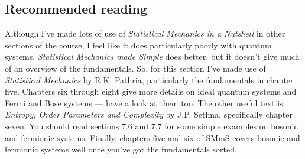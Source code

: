 
\subsection{Recommended reading}
Although I've made lots of use of \emph{Statistical Mechanics in a Nutshell} in other sections of the course, I feel like it does particularly poorly with quantum systems. \emph{Statistical Mechanics made Simple} does better, but it doesn't give much of an overview of the fundamentals. So, for this section I've made use of \emph{Statistical Mechnaics} by R.K. Pathria, particularly the fundamentals in chapter five. Chapters six through eight give more details on ideal quantum systems and Fermi and Bose systems --- have a look at them too. The other useful text is \emph{Entropy, Order Parameters and Complexity} by J.P. Sethna, specifically chapter seven. You should read sections 7.6 and 7.7 for some simple examples on bosonic and fermionic systems. Finally, chapters five and six of SMmS covers bosonic and fermionic systems well once you've got the fundamentals sorted.
